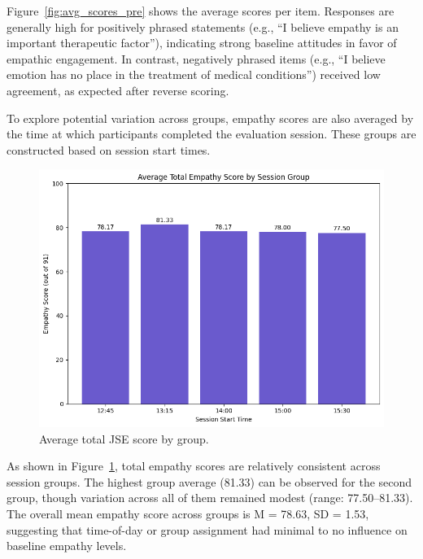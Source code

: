 \vspace{1em}

Figure~\ref{fig:avg_scores_pre} shows the average scores per item. Responses are generally high for positively phrased statements (e.g., “I believe empathy is an important therapeutic factor”), indicating strong baseline attitudes in favor of empathic engagement. In contrast, negatively phrased items (e.g., “I believe emotion has no place in the treatment of medical conditions”) received low agreement, as expected after reverse scoring.

\vspace{1em}

To explore potential variation across groups, empathy scores are also averaged by the time at which participants completed the evaluation session. These groups are constructed based on session start times.

\begin{figure}[H]
    \centering
    \includegraphics[width=0.75\columnwidth]{../../Figures/avg score-by-group-pre.png}
    \caption{Average total JSE score by group.}
    \label{fig:group_scores_pre}
\end{figure}

As shown in Figure~\ref{fig:group_scores_pre}, total empathy scores are relatively consistent across session groups. The highest group average (81.33) can be observed for the second group, though variation across all of them remained modest (range: 77.50–81.33). The overall mean empathy score across groups is M = 78.63, SD = 1.53, suggesting that time-of-day or group assignment had minimal to no influence on baseline empathy levels.


